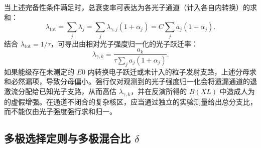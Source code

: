 当上述完备性条件满足时，总衰变率可表达为各光子通道（计入各自内转换）的求和：
\begin{equation}\label{eq:5-9-lambda-tot-flux}
\lambda_{\text{tot}} = \sum_j \lambda_j = \sum_j \lambda_{\gamma, j} (1 + \alpha_j) = C \sum_j a_j (1 + \alpha_j).
\end{equation}
结合 $\lambda_{\text{tot}} = 1/\tau$，可导出由相对光子强度归一化的光子跃迁率：
\begin{equation}\label{eq:5-9-lambda-gamma-from-a}
\lambda_{\gamma, k} = \frac{a_k}{\tau \sum_j a_j (1 + \alpha_j)}.
\end{equation}
如果能级存在未测定的 $E0$ 内转换电子跃迁或未计入的粒子发射支路，上述分母求和必然漏项，导致分母偏小。强行仅对观测到的光子强度归一化会将遗漏通道的退激流分配给已知光子支路，从而高估 $\lambda_{\gamma, k}$，并在反演所得的 $B(XL)$ 中造成人为的虚假增强。在通道不闭合的复杂核区，应当通过独立的实验测量给出总分支比，而不能仅由光子强度强行求和归一。

\subsection{多极选择定则与多极混合比 $\delta$}\label{subsec:5-9-3}

